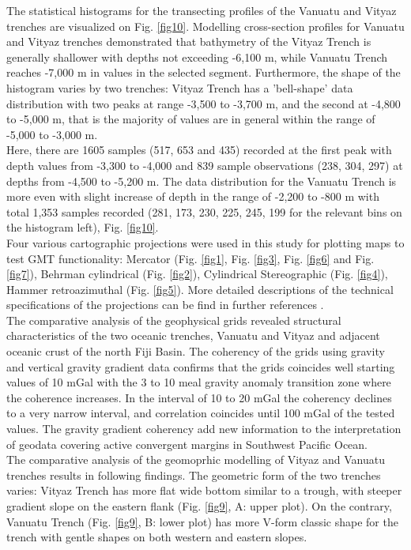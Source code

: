 \documentclass[USenglish]{article}
\begin{document}
The statistical histograms for the transecting profiles of the Vanuatu and Vityaz trenches are visualized on Fig. \ref{fig10}. Modelling cross-section profiles for  Vanuatu and Vityaz trenches demonstrated that bathymetry of the Vityaz Trench is generally shallower with depths not exceeding -6,100 m, while Vanuatu Trench reaches -7,000 m in values in the selected segment. Furthermore, the shape of the histogram varies by two trenches: Vityaz Trench has a 'bell-shape' data distribution with two peaks at range -3,500 to -3,700 m, and the second at -4,800 to -5,000 m, that is the majority of values are in general within the range of -5,000 to -3,000 m.\\
 Here, there are 1605 samples (517, 653 and 435) recorded at the first peak with depth values from -3,300 to -4,000 and 839 sample observations (238, 304, 297) at depths from -4,500 to -5,200 m. The data distribution for the Vanuatu Trench is more even with slight increase of depth in the range of -2,200 to -800 m with total 1,353 samples recorded (281, 173, 230, 225, 245, 199 for the relevant bins on the histogram left), Fig. \ref{fig10}.\\
Four various cartographic projections were used in this study for plotting maps to test GMT functionality: Mercator (Fig. \ref{fig1}, Fig. \ref{fig3}, Fig. \ref{fig6} and Fig. \ref{fig7}), Behrman cylindrical (Fig. \ref{fig2}), Cylindrical Stereographic (Fig. \ref{fig4}), Hammer retroazimuthal (Fig. \ref{fig5}). More detailed descriptions of the technical specifications of the projections can be find in further references \citep{Snyder}. \\
The comparative analysis of the geophysical grids revealed structural characteristics of the two oceanic trenches, Vanuatu and Vityaz and adjacent oceanic crust of the north Fiji Basin. The coherency of the grids using gravity and vertical gravity gradient data confirms that the grids coincides well starting values of 10 mGal with the 3 to 10 meal gravity anomaly transition zone where the coherence increases. In the interval of 10 to 20 mGal the coherency declines to a very narrow interval, and correlation coincides until 100 mGal of the tested values. The gravity gradient coherency add new information to the interpretation of geodata covering active convergent margins in Southwest Pacific Ocean.\\
The comparative analysis of the geomoprhic modelling of Vityaz and Vanuatu trenches results in following findings. The geometric form of the two trenches varies: Vityaz Trench has more flat wide bottom similar to a trough, with steeper gradient slope on the eastern flank (Fig. \ref{fig9}, A: upper plot). On the contrary, Vanuatu Trench (Fig. \ref{fig9}, B: lower plot) has more V-form classic shape for the trench with gentle shapes on both western and eastern slopes. \\
\end{document}
